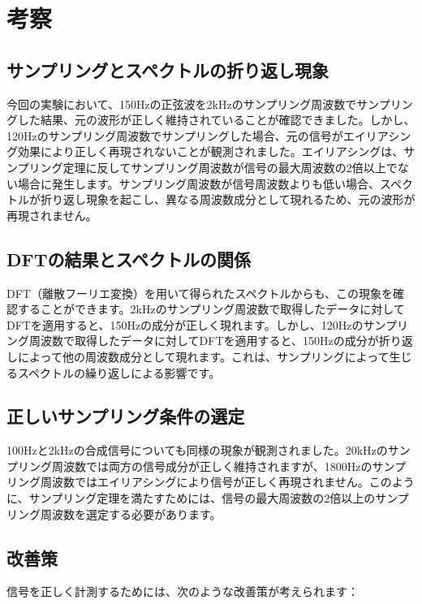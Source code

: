 \documentclass[a4paper,11pt,xelatex,ja=standard]{bxjsarticle}
\begin{document}
\section{考察}

    \subsection{サンプリングとスペクトルの折り返し現象}

        今回の実験において、150Hzの正弦波を2kHzのサンプリング周波数でサンプリングした結果、元の波形が正しく維持されていることが確認できました。しかし、120Hzのサンプリング周波数でサンプリングした場合、元の信号がエイリアシング効果により正しく再現されないことが観測されました。エイリアシングは、サンプリング定理に反してサンプリング周波数が信号の最大周波数の2倍以上でない場合に発生します。サンプリング周波数が信号周波数よりも低い場合、スペクトルが折り返し現象を起こし、異なる周波数成分として現れるため、元の波形が再現されません。

    \subsection{DFTの結果とスペクトルの関係}

        DFT（離散フーリエ変換）を用いて得られたスペクトルからも、この現象を確認することができます。2kHzのサンプリング周波数で取得したデータに対してDFTを適用すると、150Hzの成分が正しく現れます。しかし、120Hzのサンプリング周波数で取得したデータに対してDFTを適用すると、150Hzの成分が折り返しによって他の周波数成分として現れます。これは、サンプリングによって生じるスペクトルの繰り返しによる影響です。

    \subsection{正しいサンプリング条件の選定}

        100Hzと2kHzの合成信号についても同様の現象が観測されました。20kHzのサンプリング周波数では両方の信号成分が正しく維持されますが、1800Hzのサンプリング周波数ではエイリアシングにより信号が正しく再現されません。このように、サンプリング定理を満たすためには、信号の最大周波数の2倍以上のサンプリング周波数を選定する必要があります。

    \subsection{改善策}

        信号を正しく計測するためには、次のような改善策が考えられます：
\end{document}
